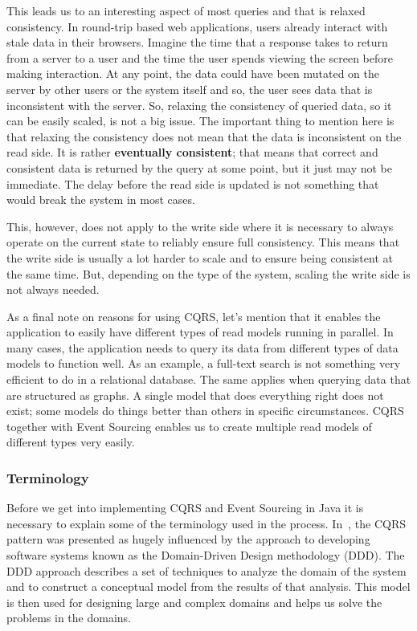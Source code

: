 \documentclass{book}
\begin{document}
This leads us to an interesting aspect of most queries and that is
relaxed consistency. In round-trip based web applications, users already
interact with stale data in their browsers. Imagine the time that a
response takes to return from a server to a user and the time the user
spends viewing the screen before making interaction. At any point, the
data could have been mutated on the server by other users or the system
itself and so, the user sees data that is inconsistent with the server.
So, relaxing the consistency of queried data, so it can be easily
scaled, is not a big issue. The important thing to mention here is that
relaxing the consistency does not mean that the data is inconsistent on
the read side. It is rather \textbf{eventually consistent}; that means
that correct and consistent data is returned by the query at some point,
but it just may not be immediate. The delay before the read side is
updated is not something that would break the system in most cases.~\cite{journey}~\cite{greg-youtube}

This, however, does not apply to the write side where it is necessary to
always operate on the current state to reliably ensure full consistency.
This means that the write side is usually a lot harder to scale and to
ensure being consistent at the same time. But, depending on the type of
the system, scaling the write side is not always needed.

As a final note on reasons for using CQRS, let's mention that it enables
the application to easily have different types of read models running in
parallel. In many cases, the application needs to query its data from
different types of data models to function well. As an example, a
full-text search is not something very efficient to do in a relational
database. The same applies when querying data that are structured as
graphs. A single model that does everything right does not exist; some
models do things better than others in specific circumstances. CQRS
together with Event Sourcing enables us to create multiple read models
of different types very easily.

\subsubsection{Terminology}\label{terminology}

Before we get into implementing CQRS and Event Sourcing in Java it is
necessary to explain some of the terminology used in the process. In~\cite{journey}, the CQRS pattern was presented as hugely influenced by
the approach to developing software systems known as the Domain-Driven
Design methodology (DDD). The DDD approach describes a set of techniques
to analyze the domain of the system and to construct a conceptual model
from the results of that analysis. This model is then used for designing
large and complex domains and helps us solve the problems in the
domains.
\end{document}
